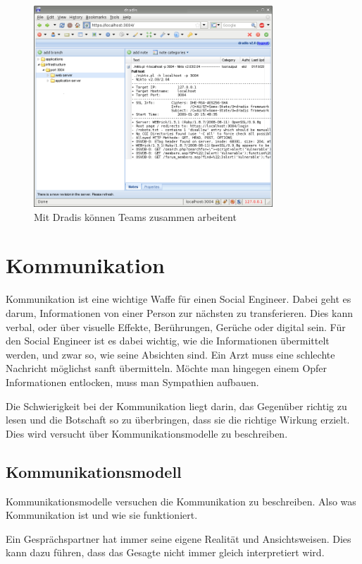 \begin{figure}[htb]
  \centering
  \includegraphics[width=0.8\textwidth]{images/dradis.png}
  \caption[Test image for television]{Mit Dradis können Teams zusammen arbeitent}
  \label{fig:socialengineering:informationssammlung:datenorganisation:basket}
\end{figure}

\section{Kommunikation}
Kommunikation ist eine wichtige Waffe für einen Social Engineer. Dabei geht es darum, Informationen von einer Person zur nächsten zu transferieren. Dies kann verbal, oder über visuelle Effekte, Berührungen, Gerüche oder digital sein.
Für den Social Engineer ist es dabei wichtig, wie die Informationen übermittelt werden, und zwar so, wie seine Absichten sind.
Ein Arzt muss eine schlechte Nachricht möglichst sanft übermitteln. Möchte man hingegen einem Opfer Informationen entlocken, muss man Sympathien aufbauen.

Die Schwierigkeit bei der Kommunikation liegt darin, das Gegenüber richtig zu lesen und die Botschaft so zu überbringen, dass sie die richtige Wirkung erzielt.
Dies wird versucht über Kommunikationsmodelle zu beschreiben.

\subsection{Kommunikationsmodell}
Kommunikationsmodelle versuchen die Kommunikation zu beschreiben. Also was Kommunikation ist und wie sie funktioniert. 

Ein Gesprächspartner hat immer seine eigene Realität und Ansichtsweisen. Dies kann dazu führen, dass das Gesagte nicht immer gleich interpretiert wird. 

